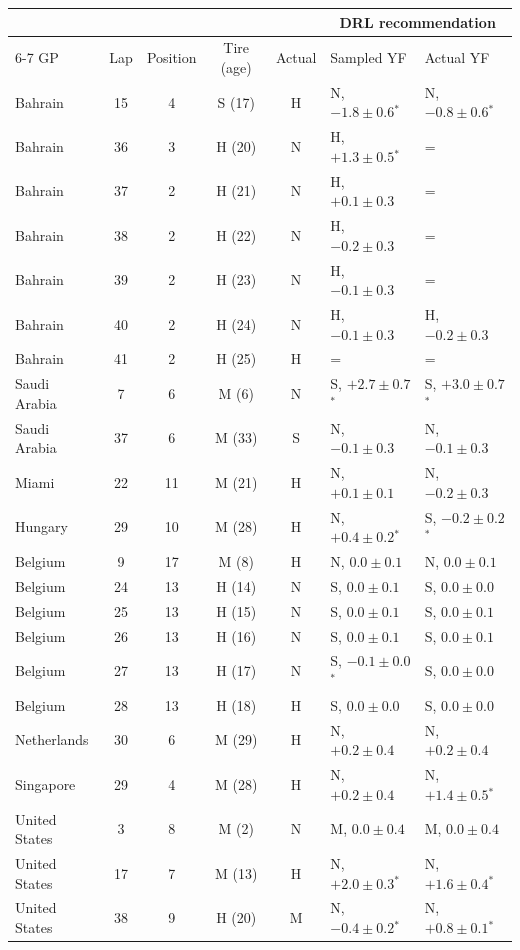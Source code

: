 \begin{tabular}{lccccll}
\toprule
& & & & & \multicolumn{2}{c}{DRL recommendation} \\
\cmidrule(lr){6-7}
GP & Lap & Position & Tire (age) & Actual & Sampled YF & Actual YF \\
\midrule
Bahrain & 15 & 4 & S (17) & H & N, $-1.8 \pm 0.6$$^{*}$ & N, $-0.8 \pm 0.6$$^{*}$ \\
Bahrain & 36 & 3 & H (20) & N & H, $+1.3 \pm 0.5$$^{*}$ & = \\
Bahrain & 37 & 2 & H (21) & N & H, $+0.1 \pm 0.3$ & = \\
Bahrain & 38 & 2 & H (22) & N & H, $-0.2 \pm 0.3$ & = \\
Bahrain & 39 & 2 & H (23) & N & H, $-0.1 \pm 0.3$ & = \\
Bahrain & 40 & 2 & H (24) & N & H, $-0.1 \pm 0.3$ & H, $-0.2 \pm 0.3$ \\
Bahrain & 41 & 2 & H (25) & H & = & = \\
Saudi Arabia & 7 & 6 & M (6) & N & S, $+2.7 \pm 0.7$$^{*}$ & S, $+3.0 \pm 0.7$$^{*}$ \\
Saudi Arabia & 37 & 6 & M (33) & S & N, $-0.1 \pm 0.3$ & N, $-0.1 \pm 0.3$ \\
Miami & 22 & 11 & M (21) & H & N, $+0.1 \pm 0.1$ & N, $-0.2 \pm 0.3$ \\
Hungary & 29 & 10 & M (28) & H & N, $+0.4 \pm 0.2$$^{*}$ & S, $-0.2 \pm 0.2$$^{*}$ \\
Belgium & 9 & 17 & M (8) & H & N, $0.0 \pm 0.1$ & N, $0.0 \pm 0.1$ \\
Belgium & 24 & 13 & H (14) & N & S, $0.0 \pm 0.1$ & S, $0.0 \pm 0.0$ \\
Belgium & 25 & 13 & H (15) & N & S, $0.0 \pm 0.1$ & S, $0.0 \pm 0.1$ \\
Belgium & 26 & 13 & H (16) & N & S, $0.0 \pm 0.1$ & S, $0.0 \pm 0.1$ \\
Belgium & 27 & 13 & H (17) & N & S, $-0.1 \pm 0.0$$^{*}$ & S, $0.0 \pm 0.0$ \\
Belgium & 28 & 13 & H (18) & H & S, $0.0 \pm 0.0$ & S, $0.0 \pm 0.0$ \\
Netherlands & 30 & 6 & M (29) & H & N, $+0.2 \pm 0.4$ & N, $+0.2 \pm 0.4$ \\
Singapore & 29 & 4 & M (28) & H & N, $+0.2 \pm 0.4$ & N, $+1.4 \pm 0.5$$^{*}$ \\
United States & 3 & 8 & M (2) & N & M, $0.0 \pm 0.4$ & M, $0.0 \pm 0.4$ \\
United States & 17 & 7 & M (13) & H & N, $+2.0 \pm 0.3$$^{*}$ & N, $+1.6 \pm 0.4$$^{*}$ \\
United States & 38 & 9 & H (20) & M & N, $-0.4 \pm 0.2$$^{*}$ & N, $+0.8 \pm 0.1$$^{*}$ \\
\bottomrule
\end{tabular}
